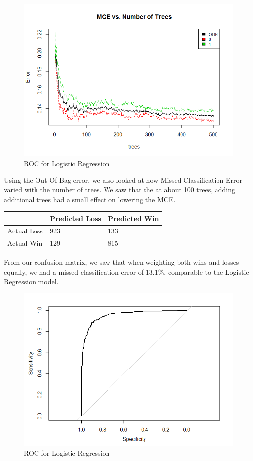 \documentclass[runningheads]{llncs}
\begin{document}
	\begin{figure}[!htb]
		\centering
		\includegraphics[width=\textwidth]{images/rf_mce.png}
		\caption{ROC for Logistic Regression}
	\end{figure}
	
	Using the Out-Of-Bag error, we also looked at how Missed Classification Error varied with the number of trees. We saw that the at about 100 trees, adding additional trees had a small effect on lowering the MCE.
	
	\begin{center}
		\begin{tabular}{ | L{3cm} | C{2cm} | C{2cm} | }
			\hline
			& Predicted Loss & Predicted Win \\ \hline
			Actual Loss & 923 & 133 \\ \hline
			Actual Win & 129 & 815 \\ \hline
		\end{tabular}
	\end{center}	
	
	From our confusion matrix, we saw that when weighting both wins and losses equally, we had a missed classification error of 13.1\%, comparable to the Logistic Regression model.
	
	\begin{figure}[!htb]
		\centering
		\includegraphics[width=\textwidth]{images/rf_roc.png}
		\caption{ROC for Logistic Regression}
	\end{figure}
		
\end{document}
